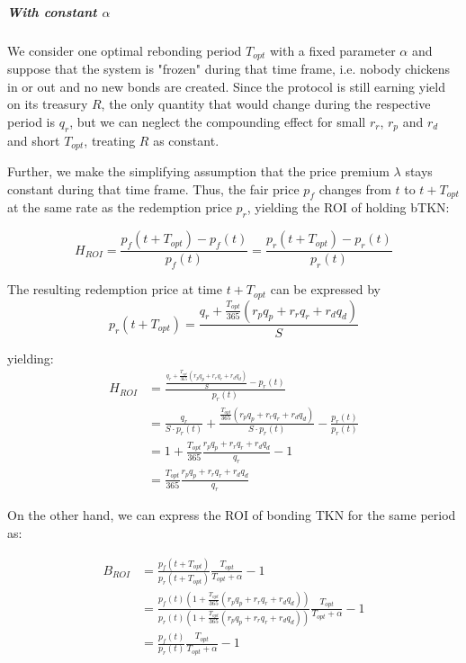 \documentclass{article}
\begin{document}
\subparagraph{With constant $\alpha$}
We consider one optimal rebonding period $T_{opt}$ with a fixed parameter $\alpha$ and suppose that the system is "frozen" during that time frame, i.e. nobody chickens in or out and no new bonds are created. Since the protocol is still earning yield on its treasury $R$, the only quantity that would change during the respective period is $q_r$, but we can neglect the compounding effect for small $r_r$, $r_p$ and $r_d$ and short $T_{opt}$, treating $R$ as constant.

Further, we make the simplifying assumption that the price premium $\lambda$ stays constant during that time frame. Thus, the fair price $p_f$ changes from $t$ to $t+T_{opt}$ at the same rate as the redemption price $p_r$, yielding the ROI of holding bTKN:

\begin{equation}
  \label{eq:ROI-eq}
  H_{ROI} = \frac{p_f(t + T_{opt}) - p_f(t)}{p_f(t)} = \frac{p_r(t + T_{opt}) - p_r(t)}{p_r(t)}
\end{equation}

The resulting redemption price at time $t + T_{opt}$ can be expressed by
\begin{equation}
  \label{eq:redemption-price}
    p_r(t + T_{opt}) = \frac{q_r + \frac{T_{opt}}{365} (r_p q_p + r_r q_r + r_d q_d)}{S}
\end{equation}

yielding:
\begin{equation}
  \label{eq:ROI-eq2}
  \begin{split}
    H_{ROI} & = \frac{\frac{q_r + \frac{T_{opt}}{365} (r_p q_p + r_r q_r + r_d q_d)}{S} - p_r(t)}{p_r(t)} \\
    & = \frac{q_r}{S \cdot p_r(t)} + \frac{\frac{T_{opt}}{365} (r_p q_p + r_r q_r + r_d q_d)}{S\cdot p_r(t)} - \frac{p_r(t)}{p_r(t)} \\
    & = 1 + \frac{T_{opt}}{365} \frac{r_p q_p + r_r q_r + r_d q_d}{q_r} - 1 \\
    & = \frac{T_{opt}}{365} \frac{r_p q_p + r_r q_r + r_d q_d}{q_r}
  \end{split}
\end{equation}

On the other hand, we can express the ROI of bonding TKN for the same period as:

\begin{equation}
  \label{eq:ROI-bonding}
  \begin{split}
    B_{ROI} & = \frac{p_f(t+T_{opt})}{p_r(t+T_{opt})}\frac{T_{opt}}{T_{opt}+\alpha} - 1 \\
    & = \frac{p_f(t)(1 + \frac{T_{opt}}{365} (r_p q_p + r_r q_r + r_d q_d))} {p_r(t)(1 + \frac{T_{opt}}{365} (r_p q_p + r_r q_r + r_d q_d))}    \frac{T_{opt}}{T_{opt}+\alpha} - 1 \\ 
    & = \frac{p_f(t)}{p_r(t)}\frac{T_{opt}}{T_{opt}+\alpha} - 1
  \end{split}
\end{equation}
\end{document}

